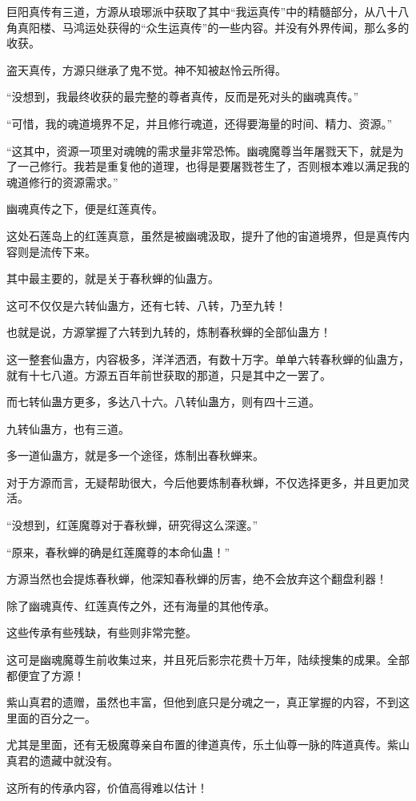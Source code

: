 \begin{this_body}
巨阳真传有三道，方源从琅琊派中获取了其中“我运真传”中的精髓部分，从八十八角真阳楼、马鸿运处获得的“众生运真传”的一些内容。并没有外界传闻，那么多的收获。

盗天真传，方源只继承了鬼不觉。神不知被赵怜云所得。

“没想到，我最终收获的最完整的尊者真传，反而是死对头的幽魂真传。”

“可惜，我的魂道境界不足，并且修行魂道，还得要海量的时间、精力、资源。”

“这其中，资源一项里对魂魄的需求量非常恐怖。幽魂魔尊当年屠戮天下，就是为了一己修行。我若是重复他的道理，也得是要屠戮苍生了，否则根本难以满足我的魂道修行的资源需求。”

幽魂真传之下，便是红莲真传。

这处石莲岛上的红莲真意，虽然是被幽魂汲取，提升了他的宙道境界，但是真传内容则是流传下来。

其中最主要的，就是关于春秋蝉的仙蛊方。

这可不仅仅是六转仙蛊方，还有七转、八转，乃至九转！

也就是说，方源掌握了六转到九转的，炼制春秋蝉的全部仙蛊方！

这一整套仙蛊方，内容极多，洋洋洒洒，有数十万字。单单六转春秋蝉的仙蛊方，就有十七八道。方源五百年前世获取的那道，只是其中之一罢了。

而七转仙蛊方更多，多达八十六。八转仙蛊方，则有四十三道。

九转仙蛊方，也有三道。

多一道仙蛊方，就是多一个途径，炼制出春秋蝉来。

对于方源而言，无疑帮助很大，今后他要炼制春秋蝉，不仅选择更多，并且更加灵活。

“没想到，红莲魔尊对于春秋蝉，研究得这么深邃。”

“原来，春秋蝉的确是红莲魔尊的本命仙蛊！”

方源当然也会提炼春秋蝉，他深知春秋蝉的厉害，绝不会放弃这个翻盘利器！

除了幽魂真传、红莲真传之外，还有海量的其他传承。

这些传承有些残缺，有些则非常完整。

这可是幽魂魔尊生前收集过来，并且死后影宗花费十万年，陆续搜集的成果。全部都便宜了方源！

紫山真君的遗赠，虽然也丰富，但他到底只是分魂之一，真正掌握的内容，不到这里面的百分之一。

尤其是里面，还有无极魔尊亲自布置的律道真传，乐土仙尊一脉的阵道真传。紫山真君的遗藏中就没有。

这所有的传承内容，价值高得难以估计！


\end{this_body}
